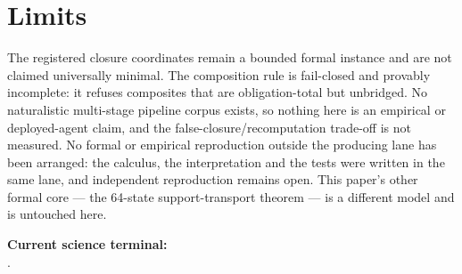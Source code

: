 \section{Limits}

The registered closure coordinates remain a bounded formal instance and are not
claimed universally minimal. The composition rule is fail-closed and provably
incomplete: it refuses composites that are obligation-total but unbridged. No
naturalistic multi-stage pipeline corpus exists, so nothing here is an empirical
or deployed-agent claim, and the false-closure/recomputation trade-off is not
measured. No formal or empirical reproduction outside the producing lane has been
arranged: the calculus, the interpretation and the tests were written in the same
lane, and independent reproduction remains open. This paper's other formal core --- the
64-state support-transport theorem --- is a different model and is untouched here.

\medskip

\noindent\textbf{Current science terminal:}\\
.
